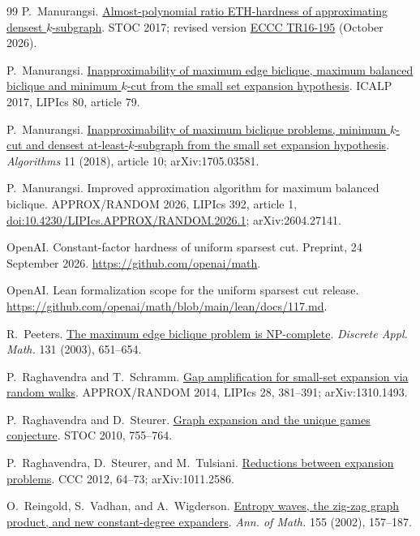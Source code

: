 \documentclass[11pt,letterpaper]{article}
\theoremstyle{definition}
\theoremstyle{remark}
\begin{document}
\begin{thebibliography}{99}
P.~Manurangsi.
\href{https://arxiv.org/abs/1611.05991}{Almost-polynomial ratio ETH-hardness of approximating densest \(k\)-subgraph}.
STOC 2017; revised version \href{https://eccc.weizmann.ac.il/report/2016/195/}{ECCC TR16-195} (October 2026).

P.~Manurangsi.
\href{https://doi.org/10.4230/LIPIcs.ICALP.2017.79}{Inapproximability of maximum edge biclique, maximum balanced biclique and minimum \(k\)-cut from the small set expansion hypothesis}.
ICALP 2017, LIPIcs 80, article 79.

P.~Manurangsi.
\href{https://www.mdpi.com/1999-4893/11/1/10}{Inapproximability of maximum biclique problems, minimum \(k\)-cut and densest at-least-\(k\)-subgraph from the small set expansion hypothesis}.
\emph{Algorithms} 11 (2018), article 10; arXiv:1705.03581.

P.~Manurangsi.
Improved approximation algorithm for maximum balanced biclique.
APPROX/RANDOM 2026, LIPIcs 392, article 1,
\href{https://doi.org/10.4230/LIPIcs.APPROX/RANDOM.2026.1}{doi:10.4230/LIPIcs.APPROX/RANDOM.2026.1}; arXiv:2604.27141.

OpenAI.
Constant-factor hardness of uniform sparsest cut.
Preprint, 24 September 2026. \url{https://github.com/openai/math}.

OpenAI.
Lean formalization scope for the uniform sparsest cut release.
\url{https://github.com/openai/math/blob/main/lean/docs/117.md}.

R.~Peeters.
\href{https://doi.org/10.1016/S0166-218X(03)00333-0}{The maximum edge biclique problem is NP-complete}.
\emph{Discrete Appl. Math.} 131 (2003), 651--654.

P.~Raghavendra and T.~Schramm.
\href{https://doi.org/10.4230/LIPIcs.APPROX-RANDOM.2014.381}{Gap amplification for small-set expansion via random walks}.
APPROX/RANDOM 2014, LIPIcs 28, 381--391; arXiv:1310.1493.

P.~Raghavendra and D.~Steurer.
\href{https://www.dsteurer.org/paper/expansion/}{Graph expansion and the unique games conjecture}.
STOC 2010, 755--764.

P.~Raghavendra, D.~Steurer, and M.~Tulsiani.
\href{https://arxiv.org/abs/1011.2586}{Reductions between expansion problems}.
CCC 2012, 64--73; arXiv:1011.2586.

O.~Reingold, S.~Vadhan, and A.~Wigderson.
\href{https://arxiv.org/abs/math/0406038}{Entropy waves, the zig-zag graph product, and new constant-degree expanders}.
\emph{Ann. of Math.} 155 (2002), 157--187.


\end{thebibliography}
\end{document}
